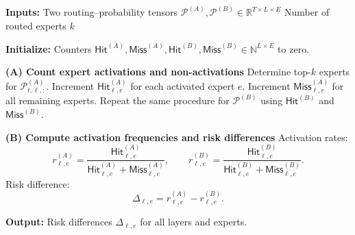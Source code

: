 \begin{algorithm}[t]
\caption{Computing Expert Risk Differences from Two Routing Distributions}
\begin{algorithmic}[1]

\STATE \textbf{Inputs:}
\STATE \hspace{0.5em} Two routing–probability tensors $\mathcal{P}^{(A)}, \mathcal{P}^{(B)} \in \mathbb{R}^{T \times L \times E}$
\STATE \hspace{0.5em} Number of routed experts $k$

\STATE \textbf{Initialize:}
\STATE Counters $\mathsf{Hit}^{(A)}, \mathsf{Miss}^{(A)}, \mathsf{Hit}^{(B)}, \mathsf{Miss}^{(B)} \in \mathbb{N}^{L \times E}$ to zero.

\STATE \textbf{(A) Count expert activations and non-activations}
    \STATE Determine top-$k$ experts for $\mathcal{P}^{(A)}_{t,\ell, :}$.
    \STATE Increment $\mathsf{Hit}^{(A)}_{\ell, e}$ for each activated expert $e$.
    \STATE Increment $\mathsf{Miss}^{(A)}_{\ell, e}$ for all remaining experts.
    \STATE Repeat the same procedure for $\mathcal{P}^{(B)}$ using $\mathsf{Hit}^{(B)}$ and $\mathsf{Miss}^{(B)}$.
  \ENDFOR
\ENDFOR

\STATE \textbf{(B) Compute activation frequencies and risk differences}
  \STATE Activation rates:
  \[
     r^{(A)}_{\ell,e} = 
       \frac{\mathsf{Hit}^{(A)}_{\ell,e}}
            {\mathsf{Hit}^{(A)}_{\ell,e} + \mathsf{Miss}^{(A)}_{\ell,e}},
     \qquad
     r^{(B)}_{\ell,e} = 
       \frac{\mathsf{Hit}^{(B)}_{\ell,e}}
            {\mathsf{Hit}^{(B)}_{\ell,e} + \mathsf{Miss}^{(B)}_{\ell,e}} .
  \]
  \STATE Risk difference:
  \[
     \Delta_{\ell,e} = r^{(A)}_{\ell,e} - r^{(B)}_{\ell,e}.
  \]
\ENDFOR

\STATE \textbf{Output:} Risk differences $\Delta_{\ell,e}$ for all layers and experts.

\end{algorithmic}
\end{algorithm}





